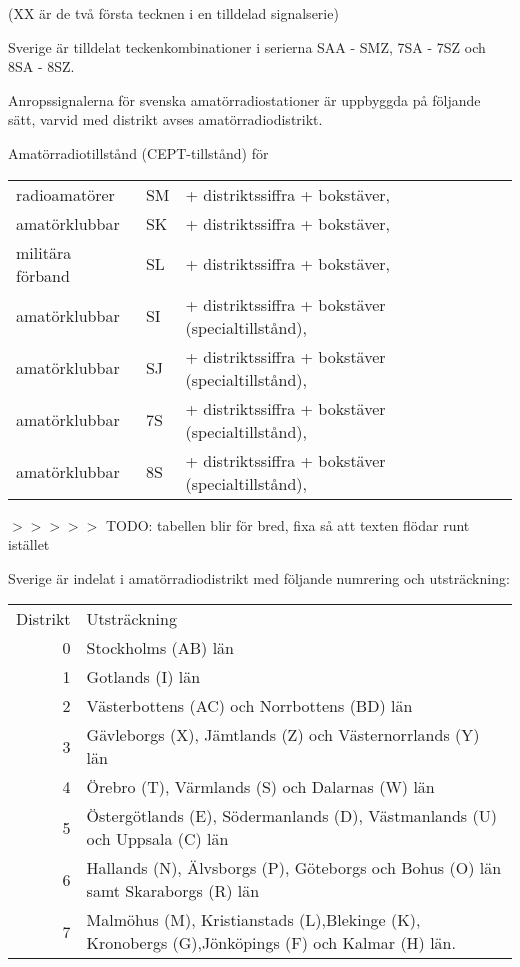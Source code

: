 (XX är de två första tecknen i en tilldelad signalserie)

Sverige är tilldelat teckenkombinationer i serierna SAA - SMZ, 7SA - 7SZ och
8SA - 8SZ.

Anropssignalerna för svenska amatörradiostationer är uppbyggda på följande
sätt, varvid med distrikt avses amatörradiodistrikt.

Amatörradiotillstånd (CEPT-tillstånd) för
\begin{tabular}{lll}
radioamatörer & SM & + distriktssiffra + bokstäver,  \\
amatörklubbar & SK & + distriktssiffra + bokstäver,  \\
militära förband & SL & + distriktssiffra + bokstäver, \\
amatörklubbar & SI & + distriktssiffra + bokstäver (specialtillstånd), \\
amatörklubbar & SJ & + distriktssiffra + bokstäver (specialtillstånd), \\
amatörklubbar & 7S & + distriktssiffra + bokstäver (specialtillstånd), \\
amatörklubbar & 8S & + distriktssiffra + bokstäver (specialtillstånd), \\
\end{tabular}

$>>>>>$ TODO: tabellen blir för bred, fixa så att texten flödar runt istället

Sverige är indelat i amatörradiodistrikt med följande numrering och
utsträckning:

\begin{tabular}{rp{5cm}}
Distrikt & Utsträckning \\
0 & Stockholms (AB) län \\
1 & Gotlands (I) län \\
2 & Västerbottens (AC) och Norrbottens (BD) län \\
3 & Gävleborgs (X), Jämtlands (Z) och Västernorrlands (Y) län \\
4 & Örebro (T), Värmlands (S) och Dalarnas (W) län \\
5 & Östergötlands (E), Södermanlands (D), Västmanlands (U) och Uppsala (C) län\\
6 & Hallands (N), Älvsborgs (P), Göteborgs och Bohus (O) län samt Skaraborgs (R) län \\
7 & Malmöhus (M), Kristianstads (L),Blekinge (K), Kronobergs (G),Jönköpings (F) och Kalmar (H) län.\\
\end{tabular}

